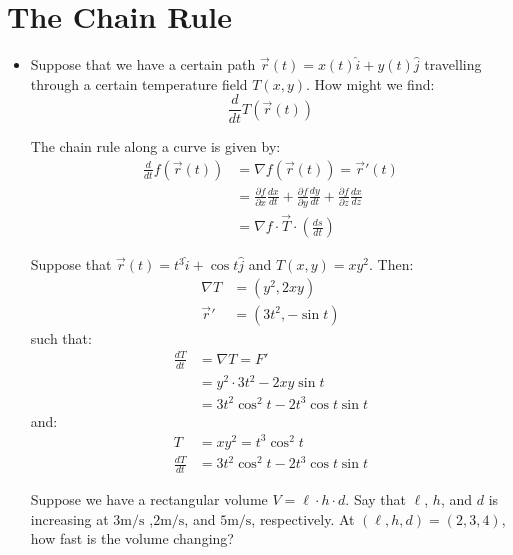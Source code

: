 \section{The Chain Rule}
\begin{itemize}
    \item Suppose that we have a certain path $\vec{r}(t)=x(t)\hat{i} + y(t)\hat{j}$ travelling through a certain temperature field $T(x,y)$. How might we find:
    \begin{equation}
        \frac{d}{dt}T(\vec{r}(t))
    \end{equation}
    \begin{theorem}
        The chain rule along a curve is given by:
        \begin{align}
            \frac{d}{dt}f(\vec{r}(t)) &= \nabla f(\vec{r}(t)) = \vec{r}'(t) \\ 
            &= \frac{\partial f}{\partial x}\frac{dx}{dt} + \frac{\partial f}{\partial y}\frac{dy}{dt} + \frac{\partial f}{\partial z}\frac{dx}{dz} \\ 
            &= \nabla f \cdot \vec{T} \cdot \left(\frac{ds}{dt}\right)
        \end{align}
    \end{theorem}
    \begin{example}
        Suppose that $\vec{r}(t)=t^3\hat{i}+\cos t\hat{j}$ and $T(x,y)=xy^2$. Then:
        \begin{align}
            \nabla T &= (y^2, 2xy) \\ 
            \vec{r}' &= (3t^2, -\sin t)
        \end{align}
        such that:
        \begin{align}
            \frac{dT}{dt} &= \nabla T = F'  \\ 
            &= y^2 \cdot 3t^2 - 2xy\sin t \\ 
            &= 3t^2\cos^2 t-2t^3\cos t\sin t 
        \end{align}
        and:
        \begin{align}
            T &= xy^2 = t^3\cos^2 t \\ 
            \frac{dT}{dt} &= 3t^2\cos^2 t - 2t^3\cos t\sin t
        \end{align}
    \end{example}
    \begin{example}
        Suppose we have a rectangular volume $V=\ell \cdot h \cdot d$. Say that $\ell$, $h$, and $d$ is increasing at $3\si{\meter\per\second}$ ,$2\si{\meter\per\second}$, and $5\si{\meter\per\second}$, respectively. At $(\ell,h,d)=(2,3,4)$, how fast is the volume changing?
        \vspace{2mm}


\end{example}
\end{itemize}
